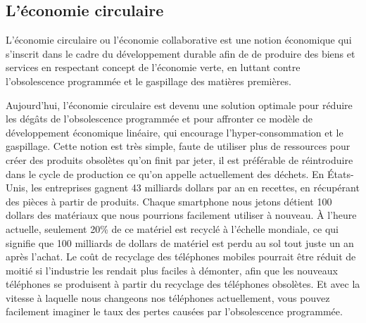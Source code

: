 \subsection{L'économie circulaire}

L’économie circulaire ou l’économie collaborative est une notion économique qui s'inscrit dans le cadre du développement durable afin de de produire des biens et services en respectant concept de l'économie verte, en luttant contre l'obsolescence programmée et le gaspillage des matières premières.

Aujourd'hui, l'économie circulaire est devenu une solution optimale pour réduire les dégâts de l'obsolescence programmée et pour affronter ce modèle de développement économique linéaire, qui encourage l’hyper-consommation et le gaspillage. Cette notion est très simple, faute de utiliser plus de ressources pour créer des produits obsolètes qu'on finit par jeter, il est préférable de réintroduire dans le cycle de production ce qu'on appelle actuellement des déchets.
En États-Unis, les entreprises gagnent 43 milliards dollars par an en recettes, en récupérant des pièces à partir de produits. Chaque smartphone nous jetons détient 100 dollars des matériaux que nous pourrions facilement utiliser à nouveau.     À l'heure actuelle, seulement 20\% de ce matériel est recyclé à l'échelle mondiale, ce qui signifie que 100 milliards de dollars de matériel est perdu au sol tout juste un an après l'achat. Le coût de recyclage des téléphones mobiles pourrait être réduit de moitié si l'industrie les rendait plus faciles à démonter, afin que les nouveaux téléphones se produisent à partir du recyclage des téléphones obsolètes. Et avec la vitesse à laquelle nous changeons nos téléphones actuellement, vous pouvez facilement imaginer le taux des pertes causées par l'obsolescence programmée.


